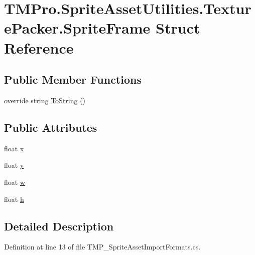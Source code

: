 \hypertarget{struct_t_m_pro_1_1_sprite_asset_utilities_1_1_texture_packer_1_1_sprite_frame}{}\section{T\+M\+Pro.\+Sprite\+Asset\+Utilities.\+Texture\+Packer.\+Sprite\+Frame Struct Reference}
\label{struct_t_m_pro_1_1_sprite_asset_utilities_1_1_texture_packer_1_1_sprite_frame}
\subsection*{Public Member Functions}
\begin{DoxyCompactItemize}
\item 
override string \mbox{\hyperlink{struct_t_m_pro_1_1_sprite_asset_utilities_1_1_texture_packer_1_1_sprite_frame_a17ef513c41437009a04928eb7db59b11}{To\+String}} ()
\end{DoxyCompactItemize}
\subsection*{Public Attributes}
\begin{DoxyCompactItemize}
\item 
float \mbox{\hyperlink{struct_t_m_pro_1_1_sprite_asset_utilities_1_1_texture_packer_1_1_sprite_frame_ac479784aa819023603261047c90340c6}{x}}
\item 
float \mbox{\hyperlink{struct_t_m_pro_1_1_sprite_asset_utilities_1_1_texture_packer_1_1_sprite_frame_a2b1b9282f0a31d2642105a5598113a09}{y}}
\item 
float \mbox{\hyperlink{struct_t_m_pro_1_1_sprite_asset_utilities_1_1_texture_packer_1_1_sprite_frame_ac1128421a042cfba03c824e645b3f85a}{w}}
\item 
float \mbox{\hyperlink{struct_t_m_pro_1_1_sprite_asset_utilities_1_1_texture_packer_1_1_sprite_frame_acf88ff0533ea4acf79dcdc74e5b2897f}{h}}
\end{DoxyCompactItemize}


\subsection{Detailed Description}


Definition at line 13 of file T\+M\+P\+\_\+\+Sprite\+Asset\+Import\+Formats.\+cs.



